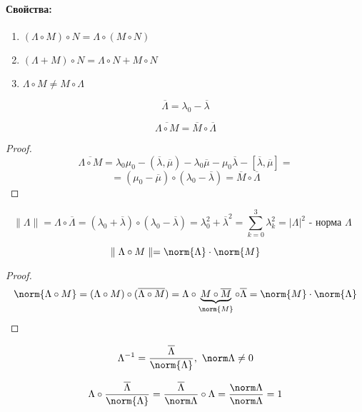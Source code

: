   \paragraph{Свойства:}
  \begin{enumerate}
    \item $(\Lambda \circ M) \circ N = \Lambda \circ (M \circ N)$
    \item $(\Lambda + M) \circ N = \Lambda \circ N + M \circ N $
    \item $\Lambda \circ M \neq M \circ \Lambda$
  \end{enumerate}
  \begin{df}
  \[ \overline{\Lambda} = \lambda_0 - \overline{\lambda} \]
  \end{df}
  \begin{ass}
  \[ \overline{\Lambda \circ M} = \overline{M} \circ \overline{\Lambda} \]
  \end{ass}
  \begin{proof}
  \[ \overline{\Lambda \circ M} = \lambda_0\mu_0 - (\overline\lambda, \overline\mu) - \lambda_0\overline\mu - \mu_0\overline\lambda - [\overline\lambda, \overline\mu] = \]
  \[ = (\mu_0 - \overline\mu) \circ (\lambda_0 - \overline\lambda) = \overline M \circ \overline \Lambda \]
  \end{proof}
  \begin{df}
  \[ \parallel \Lambda \parallel = \Lambda \circ \overline \Lambda = (\lambda_0 + \overline \lambda) \circ (\lambda_0 - \overline \lambda) = \lambda_0^2 + \overline \lambda^2 = \sum\limits_{k = 0}^3 \lambda_k^2 = | \Lambda |^2 \text{ - норма $\Lambda$ }\]
  \end{df}
  \begin{ass}
  \[ \parallel \Lambda \circ M \parallel = \norm{\Lambda} \cdot \norm{M} \]
  \end{ass}
  \begin{proof}
  \[ \norm{\Lambda \circ M} = (\Lambda \circ M) \circ (\overline{\Lambda \circ M}) = \Lambda \circ \underbrace{M \circ \overline M}_{\norm{M}}  \circ \overline \Lambda = \norm{M} \cdot \norm{\Lambda} \]
  \end{proof}
  \begin{df}
  \[ \Lambda^{-1} = \frac{\overline \Lambda}{\norm{\Lambda}},~ \norm \Lambda \neq 0 \]
  \end{df}
  \begin{ntc}
  \[ \Lambda \circ \frac{\overline{\Lambda}}{\norm{\Lambda}} = \frac{\overline \Lambda}{\norm \Lambda} \circ \Lambda = \frac{\norm \Lambda}{\norm \Lambda} = 1 \]
  \end{ntc}

